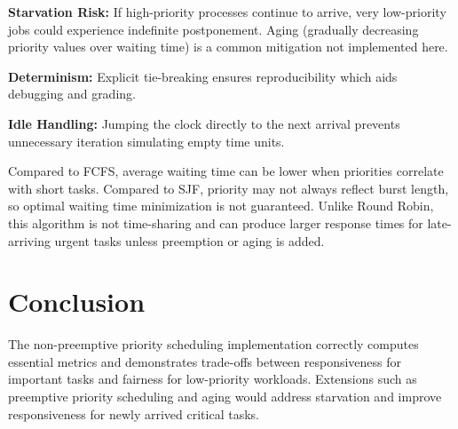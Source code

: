 \documentclass[12pt,a4paper]{article}
\begin{document}
\textbf{Starvation Risk:} If high-priority processes continue to arrive, very low-priority jobs could experience indefinite postponement. Aging (gradually decreasing priority values over waiting time) is a common mitigation not implemented here.

\textbf{Determinism:} Explicit tie-breaking ensures reproducibility which aids debugging and grading.

\textbf{Idle Handling:} Jumping the clock directly to the next arrival prevents unnecessary iteration simulating empty time units.

Compared to FCFS, average waiting time can be lower when priorities correlate with short tasks. Compared to SJF, priority may not always reflect burst length, so optimal waiting time minimization is not guaranteed. Unlike Round Robin, this algorithm is not time-sharing and can produce larger response times for late-arriving urgent tasks unless preemption or aging is added.

\section{Conclusion}
The non-preemptive priority scheduling implementation correctly computes essential metrics and demonstrates trade-offs between responsiveness for important tasks and fairness for low-priority workloads. Extensions such as preemptive priority scheduling and aging would address starvation and improve responsiveness for newly arrived critical tasks.
\end{document}

